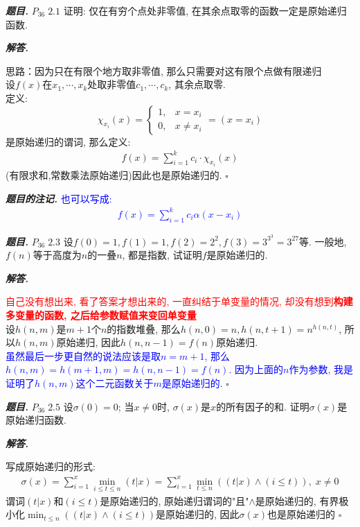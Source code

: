 \documentclass[10pt, a4paper, oneside]{ctexart}
\newenvironment{problem}{\begin{framed}\par\noindent\textbf{\textit{题目. }}}{\end{framed}\par}
\newenvironment{solution}{%
  \par\noindent\textbf{\textit{解答. }}\ignorespaces
}{%
  \hfill\ensuremath{\square}\par
}
\newenvironment{note}{\par\noindent\textbf{\textit{题目的注记. }}\ignorespaces}{\par}
\begin{document}
\begin{problem}
$P_{36}\; 2.1$ 证明: 仅在有穷个点处非零值, 在其余点取零的函数一定是原始递归函数.
\end{problem}
\begin{solution}
 思路：因为只在有限个地方取非零值, 那么只需要对这有限个点做有限递归\\
设$f(x)$在$x_1,\cdots,x_k$处取非零值$c_1,\cdots,c_k$, 其余点取零.\\
定义:
$$\chi_{x_i}(x)=\begin{cases}
    1,&x=x_i\\
    0,&x\neq x_i
\end{cases}=(x=x_i)$$
是原始递归的谓词, 那么定义:
\begin{align*}
    f(x)=\sum_{i=1}^{k}c_i\cdot\chi_{x_i}(x)
\end{align*}
(有限求和,常数乘法原始递归)因此也是原始递归的.
\end{solution}
\begin{note}
    \textcolor{blue}{也可以写成:\begin{align*}f(x)=\sum_{i=1}^{k}c_i \alpha(x-x_i)\end{align*} }
\end{note}

\begin{problem}
$P_{36}\;2.3$ 设$f(0)=1,f(1)=1,f(2)=2^2,f(3)=3^{3^3}=3^{27}$等. 一般地, $f(n)$等于高度为$n$的一叠$n$, 都是指数, 试证明$f$是原始递归的. 
\end{problem}
\begin{solution}
\textcolor{red}{自己没有想出来, 看了答案才想出来的, 一直纠结于单变量的情况, 却没有想到\textbf{构建多变量的函数, 之后给参数赋值来变回单变量}}\\
设$h(n,m)$是$m+1$个$n$的指数堆叠, 那么$h(n,0)=n,h(n,t+1)=n^{h(n,t)}$, 所以$h(n,m)$原始递归, 因此$h(n,n-1)=f(n)$原始递归.\\
\textcolor{blue}{虽然最后一步更自然的说法应该是取$n=m+1$, 那么$h(n,m)=h(m+1,m)=h(n,n-1)=f(n)$. 因为上面的$n$作为参数, 我是证明了$h(n,m)$这个二元函数关于$m$是原始递归的.}
\end{solution}

\begin{problem}
$P_{36}\;2.5$ 设$\sigma(0)=0$; 当$x\neq 0$时, $\sigma(x)$是$x$的所有因子的和. 证明$\sigma(x)$是原始递归函数.
\end{problem}
\begin{solution}
写成原始递归的形式:
\begin{align*}
    \sigma(x)=\sum_{i=1}^x \min_{i\leq t\leq n} \left(t|x\right)=\sum_{i=1}^x \min_{t\leq n} \left((t|x) \wedge (i\leq t) \right),\; x\neq 0
\end{align*}
谓词$(t|x)$和$(i\leq t)$是原始递归的, 原始递归谓词的"且"$\wedge$是原始递归的, 有界极小化$\min_{t\leq n} \left((t|x) \wedge (i\leq t) \right)$是原始递归的, 因此$\sigma(x)$也是原始递归的
\end{solution}
\end{document}
